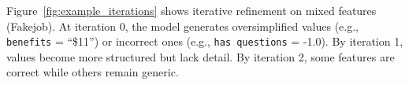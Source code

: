 Figure~\ref{fig:example_iterations} shows iterative refinement on mixed features (Fakejob). At iteration 0, the model generates oversimplified values (e.g., \texttt{benefits} = ``\$11'') or incorrect ones (e.g., \texttt{has questions} = -1.0). By iteration 1, values become more structured but lack detail. By iteration 2, some features are correct while others remain generic.


\newcommand{\promptboxchosen}[1]{%
    \fcolorbox{gray!30}{chosenbg}{%
        \begin{minipage}{0.48\linewidth}%
            \vspace{1pt}%
            \footnotesize#1%
            \vspace{1pt}%
        \end{minipage}%
    }%
}

\newcommand{\promptboxrejected}[1]{%
    \fcolorbox{gray!30}{rejectedbg}{%
        \begin{minipage}{0.48\linewidth}%
            \vspace{1pt}%
            \footnotesize#1%
            \vspace{1pt}%
        \end{minipage}%
    }%
}

\newcommand{\promptbox}[1]{%
    \fcolorbox{gray!40}{promptbg}{%
        \begin{minipage}{\linewidth}%
            \vspace{3pt}%
            \footnotesize\textbf{Prompt:} #1%
            \vspace{3pt}%
        \end{minipage}%
    }%
}

